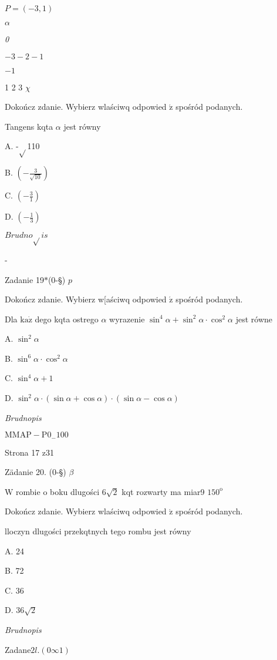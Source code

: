 \documentclass[a4paper,12pt]{article}
\begin{document}
$P=(-3,1)$

$\alpha$

{\it 0}

$-3 -2 -1$

$-1$

1 2  3  $\chi$

Dokończ zdanie. Wybierz wlaściwq odpowied $\acute{\mathrm{z}}$ spośród podanych.

Tangens kqta $\alpha$ jest równy

A. -$\sqrt{}$110

B. $(-\displaystyle \frac{3}{\sqrt{10}})$

C. $(-\displaystyle \frac{3}{1})$

D. $(-\displaystyle \frac{1}{3})$

$Brudno\sqrt{}is$

-

Zadanie 19$*$(0-\S) $p$

Dokończ zdanie. Wybierz w[aściwq odpowied $\acute{\mathrm{z}}$ spośród podanych.

Dla $\mathrm{k}\mathrm{a}\dot{\mathrm{z}}$ dego kqta ostrego $\alpha$ wyrazenie $\sin^{4}\alpha +\sin^{2}\alpha\cdot\cos^{2}\alpha$ jest równe

A. $\sin^{2}\alpha$

B. $\sin^{6}\alpha\cdot\cos^{2}\alpha$

C. $\sin^{4}\alpha+1$

D. $\sin^{2}\alpha\cdot(\sin\alpha+\cos\alpha)\cdot(\sin\alpha-\cos\alpha)$

{\it Brudnopis}

$\mathrm{M}\mathrm{M}\mathrm{A}\mathrm{P}-\mathrm{P}0_{-}100$

Strona 17 z31





Zädanie 20. (0-\S) $\beta$

$\mathrm{W}$ rombie o boku dlugości $6\sqrt{2}$ kqt rozwarty ma miar9 $150^{\mathrm{o}}$

Dokończ zdanie. Wybierz wlaściwq odpowied $\acute{\mathrm{z}}$ spośród podanych.

lloczyn dlugości przekqtnych tego rombu jest równy

A. 24

B. 72

C. 36

D. $36\sqrt{2}$

{\it Brudnopis}

Zadan$\mathrm{e}2l. (0\infty 1)$
\end{document}
